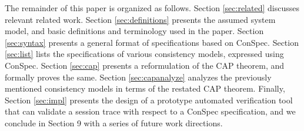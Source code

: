 \documentclass[acmlarge, ,11pt]{acmart}
\begin{document}
The remainder of this paper is organized as follows. Section \ref{sec:related} discusses relevant related work. Section  \ref{sec:definitions} presents the assumed system model, and basic definitions and terminology used in the paper.  Section \ref{sec:syntax} presents a general format of specifications based on ConSpec. Section \ref{sec:list} lists the specifications of various  consistency models, expressed using ConSpec.  Section \ref{sec:cap} presents a reformulation of the CAP theorem, and formally proves the same.  Section \ref{sec:capanalyze} analyzes the previously mentioned consistency models in terms of the restated CAP theorem.
 Finally, Section \ref{sec:impl} presents the design of a prototype automated verification tool that can validate a session trace with respect to a ConSpec specification, and we conclude in Section 9 with a series of future work directions.  %

\end{document}
